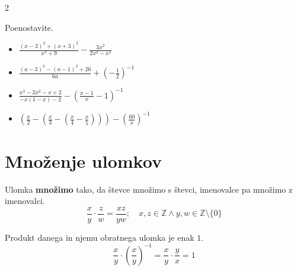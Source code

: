 \begin{multicols}{2}
        
            \begin{naloga}
                Poenostavite.
                \begin{itemize}
                    \item $\frac{(x-3)^2+(x+3)^2}{x^2+9}-\frac{3x^2}{2x^2-x^2}$ 
                    \item $\frac{(a-3)^3-(a-1)^3+26}{6a}+\left(-\frac{1}{2}\right)^{-1}$ 
                    \item $\frac{x^3-2x^2-x+2}{-x(1-x)-2}-\left(\frac{x-1}{x}-1\right)^{-1}$ 
                    \item $\left(\frac{x}{2}-\left(\frac{x}{3}-\left(\frac{x}{4}-\frac{x}{5}\right)\right)\right)-\left(\frac{60}{x}\right)^{-1}$ 
                \end{itemize}
            \end{naloga}
        
\end{multicols}
            
        
        \section{Množenje ulomkov}


                Ulomka \textbf{množimo} tako, da števce množimo s števci, imenovalce pa množimo z imenovalci.
                $$\dfrac{x}{y}\cdot \dfrac{z}{w}=\dfrac{xz}{yw}; \quad x,z\in\mathbb{Z}\land y,w\in\mathbb{Z}\setminus\{0\}$$
                
            
                Produkt danega in njemu obratnega ulomka je enak $1$.
                $$\dfrac{x}{y}\cdot\left(\dfrac{x}{y}\right)^{-1}=\dfrac{x}{y}\cdot\dfrac{y}{x}=1$$
            
        
            ~

